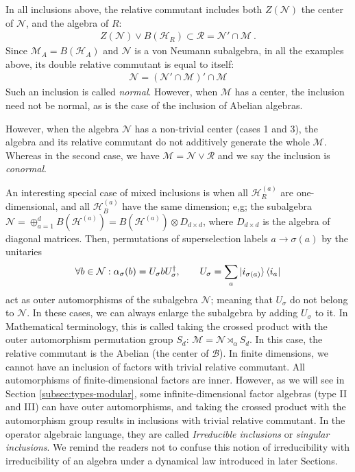 \documentclass[a4paper,11pt]{article}
\theoremstyle{definition}
\newcommand{\mB}{\mathcal{B}}
\newcommand{\mR}{\mathcal{R}}
\newcommand{\mN}{\mathcal{N}}
\newcommand{\mH}{\mathcal{H}}
\newcommand{\mM}{\mathcal{M}}
\newcommand{\NL}[1]{\textcolor{blue}{#1}}
\begin{document}
In all inclusions above, the relative commutant includes both $Z(\mN)$ the center of $\mN$, and the algebra of $R$:
\begin{align}
    Z(\mN)\vee B(\mH_R)\subset \mR=\mN'\cap \mM\ .
\end{align}
Since $\mM_A=B(\mH_A)$ and $\mN$ is a von Neumann subalgebra, in all the examples above, its double relative commutant is equal to itself:
\begin{align}
    \mN=(\mN'\cap \mM)'\cap\mM
\end{align}
Such an inclusion is called {\it normal}. However, when $\mM$ has a center, the inclusion need not be normal, as is the case of the inclusion of Abelian algebras. 

However, when the algebra $\mN$ has a non-trivial center (cases 1 and 3), the algebra and its relative commutant do not additively generate the whole $\mM$. Whereas in the second case, we have $\mM=\mN\vee \mR$ and we say the inclusion is {\it conormal}.

An interesting special case of mixed inclusions is when all $\mH_R^{(a)}$ are one-dimensional, and all $\mH_B^{(a)}$ have the same dimension; e,g; the subalgebra $\mN=\oplus_{a=1}^d B(\mH^{(a)})=B(\mH^{(a)})\otimes D_{d\times d}$, where $D_{d\times d}$ is the algebra of diagonal matrices. Then, permutations of superselection labels $a\to \sigma(a)$ by the unitaries
 \begin{align}
    \forall b\in\mN: \alpha_\sigma(b)=U_\sigma b U_\sigma^\dagger,\qquad U_{\sigma}=\sum_a \ket{i_{\sigma(a)}}\bra{i_a}
 \end{align}
act as outer automorphisms of the subalgebra $\mN$; meaning that $U_\sigma$ do not belong to $\mN$. In these cases, we can always enlarge the subalgebra by adding $U_\sigma$ to it. In Mathematical terminology, this is called taking the crossed product with the outer automorphism permutation group $S_d$: $\mM=\mN\rtimes_\alpha S_d$. In this case, the relative commutant is the Abelian (the center of $\mB$). In finite dimensions, we cannot have an inclusion of factors with trivial relative commutant. All automorphisms of finite-dimensional factors are inner. However, as we will see in Section \NL{\ref{subsec:types-modular}}, some infinite-dimensional factor algebras (type II and III) can have outer automorphisms, and taking the crossed product with the automorphism group results in inclusions with trivial relative commutant. In the operator algebraic language, they are called {\it Irreducible inclusions} or {\it singular inclusions}. We remind the readers not to confuse this notion of irreducibility with irreducibility of an algebra under a dynamical law introduced in later Sections.
\end{document}
